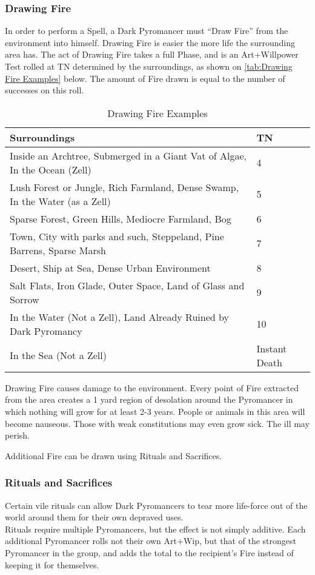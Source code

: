 \documentclass[oneside,11pt,english]{book}
\begin{document}
\subsubsection{Drawing Fire}
In order to perform a Spell, a Dark Pyromancer must “Draw Fire” from the environment into 
himself. Drawing Fire is easier the more life the surrounding area has. The act of Drawing Fire 
takes a full Phase, and is an Art+Willpower Test rolled at TN determined by the surroundings, 
as shown on \autoref{tab:Drawing Fire Examples} below. The amount of Fire drawn is equal to the number of successes on this roll. 
\begin{table}[ht]
	\centering
	\caption{Drawing Fire Examples}
	\label{tab:Drawing Fire Examples}
	\begin{tabu} spread 0pt {XX[-1]}
Surroundings&TN\\\toprule
Inside an Archtree, Submerged in a Giant  Vat of Algae, In the Ocean (Zell)  &4  \\
Lush Forest or Jungle, Rich Farmland,  Dense Swamp, In the Water (as a Zell) &5  \\
Sparse Forest, Green Hills, Mediocre  Farmland, Bog &6  \\
Town, City with parks and such, Steppeland,  Pine Barrens, Sparse Marsh  &7  \\
Desert, Ship at Sea, Dense Urban  Environment  &8  \\
Salt Flats, Iron Glade, Outer Space, Land  of Glass and Sorrow &9\\
In the Water (Not a Zell), Land Already Ruined by Dark Pyromancy  &10\\
In the Sea (Not a Zell)  &Instant Death  \\
	\end{tabu}
\end{table}
Drawing Fire causes damage to the environment. Every point of Fire extracted from the area 
creates a 1 yard region of desolation around the Pyromancer in which nothing will grow for at 
least 2-3 years. People or animals in this area will become nauseous. Those with weak 
constitutions may even grow sick. The ill may perish. 

Additional Fire can be drawn using Rituals and Sacrifices. 

\subsubsection{Rituals and Sacrifices}
Certain vile rituals can allow Dark Pyromancers to tear more life-force out of the world around 
them for their own depraved uses.\\
Rituals require multiple Pyromancers, but the effect is not simply additive. Each additional 
Pyromancer rolls not their own Art+Wip, but that of the strongest Pyromancer in the group, and 
adds the total to the recipient’s Fire instead of keeping it for themselves. 
\end{document}
